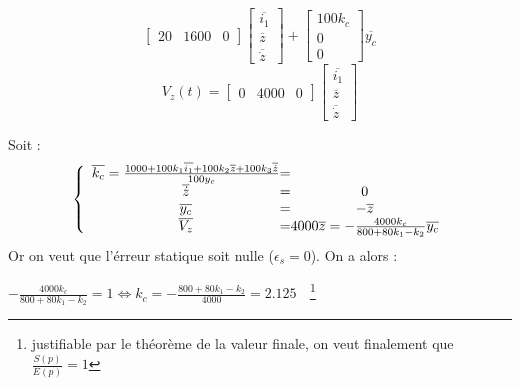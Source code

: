 {{{\begin{center}
\[\begin{bmatrix}
        20             & 1600       & 0
    \end{bmatrix}
    \begin{bmatrix}
        \overline{i_{1}} \\
        \overline{z} \\
        \overline{\dot{z}}   
    \end{bmatrix}
    +
    \begin{bmatrix}
        100k_{c} \\
        0 \\
        0
    \end{bmatrix}
    \overline{y_{c}}
    \] \newline
    \[
    V_{z}(t) = 
    \begin{bmatrix}
        0 & 4000 & 0
    \end{bmatrix}
    \begin{bmatrix}
        \overline{i_{1}} \\
        \overline{z} \\
        \overline{\dot{z}}  
    \end{bmatrix}
    \]
\end{center}
Soit : 
\[
    \left \{
    \begin{array}{c @{=} c}
        \overline{k_{c}} = \frac{1000+100k_{1}\overline{i_{1}} + 100k_{2}\overline{z} + 100k_{3}\overline{\dot{z}}}{100y_{c}} \\
        \overline{\dot{z}} & 0 \\
        \overline{y_{c}} & -\overline{z}\\
        \overline{V_{z}} & 4000 \overline{z} = - \frac{4000k_{c}}{800 +80k_{1}-k_{2}}\overline{y_{c}} 
    \end{array}
    \right.
\]
Or on veut que l'érreur statique soit nulle ($\epsilon_{s} = 0$). On a alors : 
\begin{center}
    \LARGE{$
    -\frac{4000k_{c}}{800 + 80k_{1}-k_{2}} = 1 \Longleftrightarrow k_{c} = -\frac{800 +80k_{1}-k_{2}}{4000} = 2.125
    $} 
    \textcolor{white}{.}\newline
    \footnote{justifiable par le théorème de la valeur finale, on veut finalement que $\frac{S(p)}{E(p)}=1$}
\end{center}
\newpage
}}}

